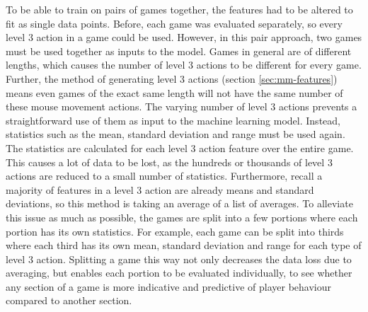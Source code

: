 \documentclass[Report.tex]{subfiles}
\begin{document}
To be able to train on pairs of games together, the features had to be altered to fit as single data points. Before, each game was evaluated separately, so every level 3 action in a game could be used. However, in this pair approach, two games must be used together as inputs to the model. Games in general are of different lengths, which causes the number of level 3 actions to be different for every game. Further, the method of generating level 3 actions (section \ref{sec:mm-features}) means even games of the exact same length will not have the same number of these mouse movement actions. The varying number of level 3 actions prevents a straightforward use of them as input to the machine learning model. Instead, statistics such as the mean, standard deviation and range must be used again. The statistics are calculated for each level 3 action feature over the entire game. This causes a lot of data to be lost, as the hundreds or thousands of level 3 actions are reduced to a small number of statistics. Furthermore, recall a majority of features in a level 3 action are already means and standard deviations, so this method is taking an average of a list of averages. To alleviate this issue as much as possible, the games are split into a few portions where each portion has its own statistics. For example, each game can be split into thirds where each third has its own mean, standard deviation and range for each type of level 3 action. Splitting a game this way not only decreases the data loss due to averaging, but enables each portion to be evaluated individually, to see whether any section of a game is more indicative and predictive of player behaviour compared to another section.
\end{document}
